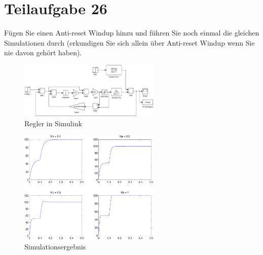 \section{Teilaufgabe 26}
\begin{aufgabe}
    Fügen Sie einen Anti-reset Windup hinzu und führen Sie noch einmal die 
    gleichen Simulationen durch (erkundigen Sie sich allein über Anti-reset 
    Windup wenn Sie nie davon gehört haben).
\end{aufgabe}
\begin{figure}[h!]
    \centering
    \includegraphics[width=0.6\textwidth]{26/regler_antiwindup.pdf}
    \caption{Regler in Simulink}
    \label{fig:26}
\end{figure}
\begin{figure}[h!]
    \centering
    \includegraphics[width=0.6\textwidth]{26/regler_antiwindup_plot.pdf}
    \caption{Simulationsergebnis}
    \label{fig:26plot}
\end{figure}

